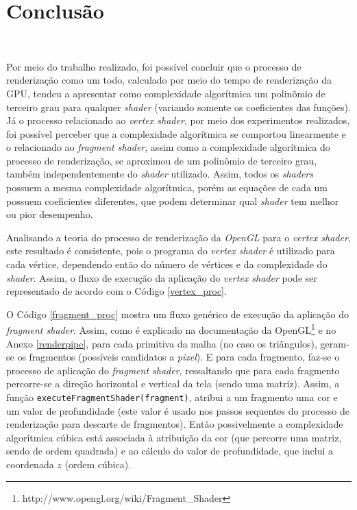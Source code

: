 \chapter[Conclusao]{Conclusão}\

	Por meio do trabalho realizado, foi possível concluir que o processo de renderização como um todo, calculado por meio do tempo de renderização da GPU, tendeu a apresentar como complexidade algorítmica um polinômio de terceiro grau para qualquer \textit{shader} (variando somente os coeficientes das funções).  Já o processo relacionado ao \textit{vertex shader}, por meio dos experimentos realizados, foi possível perceber que a complexidade algorítmica se comportou linearmente e o relacionado ao \textit{fragment shader}, assim como a complexidade algorítmica do processo de renderização, se aproximou de um polinômio de terceiro grau, também independentemente do \textit{shader} utilizado. Assim, todos os \textit{shaders} possuem a mesma complexidade algorítmica, porém as equações de cada um possuem coeficientes diferentes, que podem determinar qual \textit{shader} tem melhor ou pior desempenho.

	Analisando a teoria do processo de renderização da \textit{OpenGL} para o \textit{vertex shader}, este resultado é consistente, pois o programa do \textit{vertex shader} é utilizado para cada vértice, dependendo então do número de vértices e da complexidade do \textit{shader}.  Assim, o fluxo de execução da aplicação do \textit{vertex shader} pode ser representado de acordo com o Código \ref{vertex_proc}.

	 

	O Código \ref{fragment_proc} mostra um fluxo genérico de execução da aplicação do \textit{fragment shader}. Assim, como é explicado na documentação da OpenGL\footnote{http://www.opengl.org/wiki/Fragment\_Shader} e no Anexo \ref{renderpipe}, para cada primitiva da malha (no caso os triângulos), geram-se os fragmentos (possíveis candidatos a \textit{pixel}). E para cada fragmento, faz-se o processo de aplicação do \textit{fragment shader}, ressaltando que para cada fragmento percorre-se a direção horizontal e vertical da tela (sendo uma matriz). Assim, a função \texttt{executeFragmentShader(fragment)}, atribui a um fragmento uma cor e um valor de profundidade (este valor é usado nos passos sequentes do processo de renderização para descarte de fragmentos). Então possivelmente a complexidade algorítmica cúbica está associada à atribuição da cor (que percorre uma matriz, sendo de ordem quadrada) e ao cálculo do valor de profundidade, que inclui a coordenada $z$ (ordem cúbica). 

